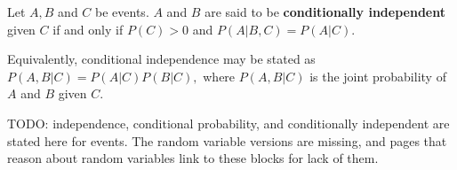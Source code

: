 \documentclass{article}
\begin{document}
\begin{definition}
	Let $A, B$ and $C$ be \@{events}. $A$ and $B$ are said to be \textbf{conditionally independent} given $C$ if and only if $P(C) > 0$ and $P(A | B, C) = P(A|C).$

	Equivalently, conditional independence may be stated as $P(A, B|C) = P(A|C)P(B|C),$ where $P(A, B|C)$ is the \@{joint probability} of $A$ and $B$ given $C.$
\end{definition}

TODO: \@{independence}, \@{conditional probability}, and \@{conditionally independent} are stated here for \@{events}. The \@{random variable} versions are missing, and pages that reason about random variables link to these blocks for lack of them.
\end{document}

